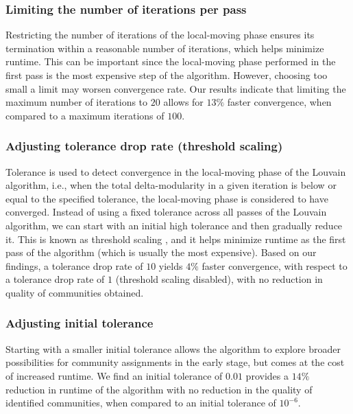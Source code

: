 \subsubsection{Limiting the number of iterations per pass}

Restricting the number of iterations of the local-moving phase ensures its termination within a reasonable number of iterations, which helps minimize runtime. This can be important since the local-moving phase performed in the first pass is the most expensive step of the algorithm. However, choosing too small a limit may worsen convergence rate. Our results indicate that limiting the maximum number of iterations to $20$ allows for $13\%$ faster convergence, when compared to a maximum iterations of $100$.


\subsubsection{Adjusting tolerance drop rate (threshold scaling)}

Tolerance is used to detect convergence in the local-moving phase of the Louvain algorithm, i.e., when the total delta-modularity in a given iteration is below or equal to the specified tolerance, the local-moving phase is considered to have converged. Instead of using a fixed tolerance across all passes of the Louvain algorithm, we can start with an initial high tolerance and then gradually reduce it. This is known as threshold scaling \cite{com-lu15, com-naim17, com-halappanavar17}, and it helps minimize runtime as the first pass of the algorithm (which is usually the most expensive). Based on our findings, a tolerance drop rate of $10$ yields $4\%$ faster convergence, with respect to a tolerance drop rate of $1$ (threshold scaling disabled), with no reduction in quality of communities obtained.


\subsubsection{Adjusting initial tolerance}

Starting with a smaller initial tolerance allows the algorithm to explore broader possibilities for community assignments in the early stage, but comes at the cost of increased runtime. We find an initial tolerance of $0.01$ provides a $14\%$ reduction in runtime of the algorithm with no reduction in the quality of identified communities, when compared to an initial tolerance of $10^{-6}$.


